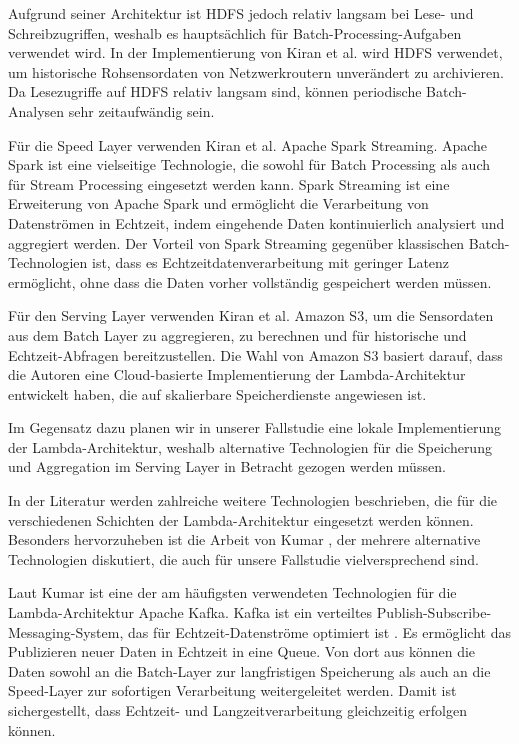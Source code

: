 Aufgrund seiner Architektur ist HDFS jedoch relativ langsam bei Lese- und Schreibzugriffen, weshalb es hauptsächlich für Batch-Processing-Aufgaben verwendet wird. In der Implementierung von Kiran et al. wird HDFS verwendet, um historische Rohsensordaten von Netzwerkroutern unverändert zu archivieren. Da Lesezugriffe auf HDFS relativ langsam sind, können periodische Batch-Analysen sehr zeitaufwändig sein.

Für die Speed Layer verwenden Kiran et al. \cite{kiran2015lambda} Apache Spark Streaming. Apache Spark ist eine vielseitige Technologie, die sowohl für Batch Processing als auch für Stream Processing eingesetzt werden kann. Spark Streaming ist eine Erweiterung von Apache Spark und ermöglicht die Verarbeitung von Datenströmen in Echtzeit, indem eingehende Daten kontinuierlich analysiert und aggregiert werden.
Der Vorteil von Spark Streaming gegenüber klassischen Batch-Technologien ist, dass es Echtzeitdatenverarbeitung mit geringer Latenz ermöglicht, ohne dass die Daten vorher vollständig gespeichert werden müssen.

Für den Serving Layer verwenden Kiran et al. \cite{kiran2015lambda} Amazon S3, um die Sensordaten aus dem Batch Layer zu aggregieren, zu berechnen und für historische und Echtzeit-Abfragen bereitzustellen. Die Wahl von Amazon S3 basiert darauf, dass die Autoren eine Cloud-basierte Implementierung der Lambda-Architektur entwickelt haben, die auf skalierbare Speicherdienste angewiesen ist.

Im Gegensatz dazu planen wir in unserer Fallstudie eine lokale Implementierung der Lambda-Architektur, weshalb alternative Technologien für die Speicherung und Aggregation im Serving Layer in Betracht gezogen werden müssen.

In der Literatur werden zahlreiche weitere Technologien beschrieben, die für die verschiedenen Schichten der Lambda-Architektur eingesetzt werden können. Besonders hervorzuheben ist die Arbeit von Kumar \cite{kumar2020lambda}, der mehrere alternative Technologien diskutiert, die auch für unsere Fallstudie vielversprechend sind.

Laut Kumar \cite{kumar2020lambda} ist eine der am häufigsten verwendeten Technologien für die Lambda-Architektur Apache Kafka. Kafka ist ein verteiltes Publish-Subscribe-Messaging-System, das für Echtzeit-Datenströme optimiert ist \cite{kreps2011kafka}. Es ermöglicht das Publizieren neuer Daten in Echtzeit in eine Queue. Von dort aus können die Daten sowohl an die Batch-Layer zur langfristigen Speicherung als auch an die Speed-Layer zur sofortigen Verarbeitung weitergeleitet werden. Damit ist sichergestellt, dass Echtzeit- und Langzeitverarbeitung gleichzeitig erfolgen können.

